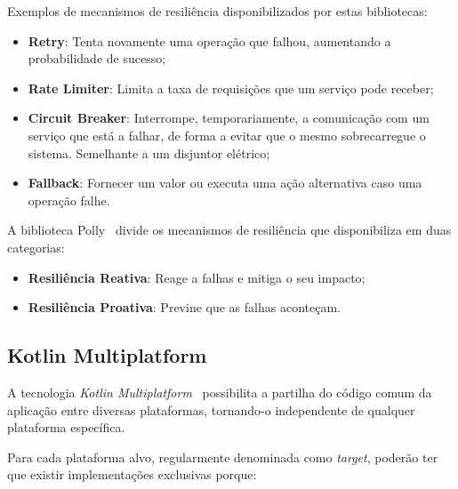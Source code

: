 Exemplos de mecanismos de resiliência disponibilizados por estas bibliotecas:

\begin{itemize}[topsep=0pt,itemsep=0pt,partopsep=0pt, parsep=0pt]
    \item \textbf{Retry}: Tenta novamente uma operação que falhou, aumentando a probabilidade de sucesso;
    \item \textbf{Rate Limiter}: Limita a taxa de requisições que um serviço pode receber;
    \item \textbf{Circuit Breaker}: Interrompe, temporariamente, a comunicação com um serviço que está a falhar, de forma a evitar que o mesmo sobrecarregue o sistema. Semelhante a um disjuntor elétrico;
    \item \textbf{Fallback}: Fornecer um valor ou executa uma ação alternativa caso uma operação falhe.
\end{itemize}

A biblioteca Polly~\cite{polly-dotnet} divide os mecanismos de resiliência que disponibiliza em duas categorias:

\begin{itemize}[topsep=0pt,itemsep=0pt,partopsep=0pt, parsep=0pt]
    \item \textbf{Resiliência Reativa}: Reage a falhas e mitiga o seu impacto;
    \item \textbf{Resiliência Proativa}: Previne que as falhas aconteçam.
\end{itemize}

\subsection{Kotlin Multiplatform}\label{subsec:kotlin-multiplatform}

A tecnologia \textit{Kotlin Multiplatform}~\cite{kmp} possibilita a partilha do código comum da aplicação entre diversas plataformas, tornando-o independente de qualquer plataforma específica.

Para cada plataforma alvo, regularmente denominada como \textit{target}, poderão ter que existir implementações exclusivas porque:

